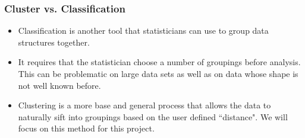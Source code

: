 \documentclass{beamer}
\begin{document}
\begin{frame}
\frametitle{Cluster vs. Classification}
\begin{itemize}
\item Classification is another tool that statisticians can use to group data structures together.
\pause
\item It requires that the statistician choose a number of groupings before analysis. This can be problematic on large data sets as well as on data whose shape is not well known before.
\pause
\item Clustering is a more base and general process that allows the data to naturally sift into groupings based on the user defined ``distance". We will focus on this method for this project.
\end{itemize}
\end{frame}
\end{document}
